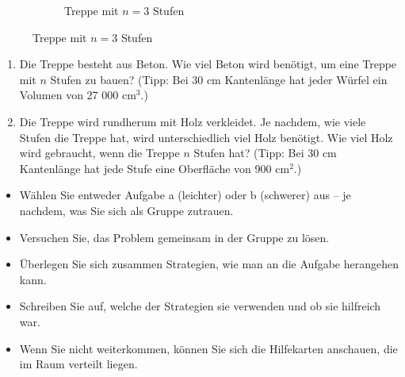 \documentclass[11pt, a4paper, oneside]{article}
\begin{document}
\begin{figure}[H]
\begin{subfigure}[b]{.3\textwidth}
			\caption{Treppe mit $n = 3$ Stufen}
		\end{subfigure}
	\end{figure}
	
	\begin{enumerate}[label=\alph*)]
		\item Die Treppe besteht aus Beton.
		Wie viel Beton wird benötigt, um eine Treppe mit $n$ Stufen zu bauen?
		(Tipp: Bei 30 cm Kantenlänge hat jeder Würfel ein Volumen von 27 000 $\mathrm{cm}^3$.)
		\item Die Treppe wird rundherum mit Holz verkleidet.
		Je nachdem, wie viele Stufen die Treppe hat, wird unterschiedlich viel Holz benötigt.
		Wie viel Holz wird gebraucht, wenn die Treppe $n$ Stufen hat?
		(Tipp: Bei 30 cm Kantenlänge hat jede Stufe eine Oberfläche von 900 $\mathrm{cm}^2$.)
	\end{enumerate}
	
	\begin{itemize}
		\item Wählen Sie entweder Aufgabe a (leichter) oder b (schwerer) aus -- je nachdem, was Sie sich als Gruppe zutrauen.
		\item Versuchen Sie, das Problem gemeinsam in der Gruppe zu lösen.
		\item Überlegen Sie sich zusammen Strategien, wie man an die Aufgabe herangehen kann.
		\item Schreiben Sie auf, welche der Strategien sie verwenden und ob sie hilfreich war.
		\item Wenn Sie nicht weiterkommen, können Sie sich die Hilfekarten anschauen, die im Raum verteilt liegen.
	\end{itemize}

	
\end{document}
